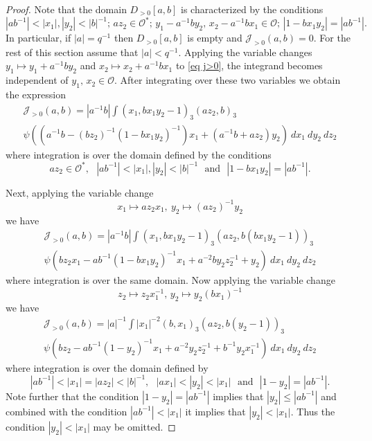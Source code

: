 \documentclass[12pt]{amsart}
\newcommand{\abs}[1]{\left|{#1}\right|}
\newcommand{\J}{\mathcal{J}}
\renewcommand{\O}{\mathcal{O}}
\theoremstyle{remark}
\begin{document}
\begin{proof}
Note that the domain $D_{>0}[a,b]$ is characterized by the conditions
\[
\abs{ab^{-1}}<\abs{x_1},\abs{y_2}<\abs{b}^{-1};\, az_2\in \O^*;\, y_1-a^{-1}by_2,\,x_2-a^{-1}bx_1\in \O;\, \abs{1-bx_1y_2}=\abs{ab^{-1}}.
\]
In particular, if $\abs{a}=q^{-1}$ then $D_{>0}[a,b]$ is empty and $\J_{>0}(a,b)=0$. For the rest of this section assume that $\abs{a}<q^{-1}$.
Applying the variable changes $y_1\mapsto y_1+a^{-1}by_2$ and $x_2\mapsto x_2+a^{-1}bx_1$ to \eqref{eq j>0},
the integrand becomes independent of $y_1,\,x_2\in\O$. After integrating over these two variables we obtain the expression
\begin{multline*}
\J_{>0}(a,b)=\abs{a^{-1}b}\int (x_1,bx_1y_2-1)_3  (az_2,b)_3\\
 \psi((a^{-1}b-(b z_2)^{-1}(1-bx_1y_2)^{-1})x_1+(a^{-1}b+az_2)y_2)\ dx_1\ dy_2\ dz_2
\end{multline*}
where integration is over the domain defined by the conditions
\[
az_2\in\O^*,\ \ \ \abs{ab^{-1}}<\abs{x_1},\abs{y_2}<\abs{b}^{-1}\ \ \  \text{and} \ \ \ \abs{1-bx_1y_2}=\abs{ab^{-1}}. 
\]

Next, applying the variable change 
\[
x_1\mapsto az_2x_1, \ y_2\mapsto (az_2)^{-1}y_2
\]
we have
\begin{multline*}
\J_{>0}(a,b)=\abs{a^{-1}b}\int (x_1,bx_1y_2-1)_3  (az_2,b(bx_1y_2-1))_3 \\ \psi(bz_2x_1-ab^{-1}(1-bx_1y_2)^{-1}x_1+a^{-2}by_2z_2^{-1}+y_2)\ dx_1\ dy_2\ dz_2
\end{multline*}
where integration is over the same domain.
Now applying the variable change 
\[
z_2\mapsto z_2x_1^{-1},\,y_2\mapsto y_2(bx_1)^{-1}
\]
we have
\begin{multline*}
\J_{>0}(a,b)=\abs{a}^{-1}\int \abs{x_1}^{-2}(b,x_1)_3  (az_2,b(y_2-1))_3 \\ \psi(bz_2-ab^{-1}(1-y_2)^{-1}x_1+a^{-2}y_2z_2^{-1}+b^{-1}y_2x_1^{-1})\ dx_1\ dy_2\ dz_2
\end{multline*}
where integration is over the domain defined by
\[
\abs{ab^{-1}}<\abs{x_1}=\abs{az_2}<\abs{b}^{-1},\ \ \ \abs{ax_1}<\abs{y_2}<\abs{x_1}\ \ \  \text{and} \ \ \ \abs{1-y_2}=\abs{ab^{-1}}. 
\]
Note further that the condition $\abs{1-y_2}=\abs{ab^{-1}}$ implies that $\abs{y_2}\le \abs{ab^{-1}}$ and combined with the condition $\abs{ab^{-1}}<\abs{x_1}$ it 
implies that $\abs{y_2}<\abs{x_1}$. Thus the condition $\abs{y_2}<\abs{x_1}$ may be omitted.


\end{proof}
\end{document}

